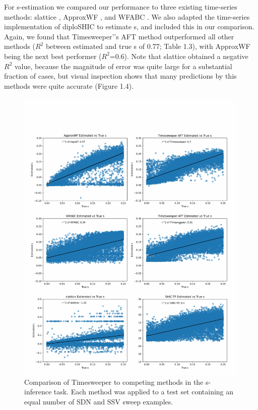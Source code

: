 

For s-estimation we compared our performance to three existing time-series methods: slattice \cite{mathiesonEstimatingSelectionCoefficients2013}, ApproxWF \cite{ferrer-admetllaApproximateMarkovModel2016}, and WFABC \cite{follWFABCWrightFisher2015}. We also adapted the time-series implementation of diploSHIC to estimate s, and included this in our comparison. Again, we found that Timesweeper’'s AFT method outperformed all other methods ($R^2$ between estimated and true s of 0.77; Table 1.3), with ApproxWF being the next best performer ($R^2$=0.6). Note that slattice obtained a negative $R^2$ value, because the magnitude of error was quite large for a substantial fraction of cases, but visual inspection shows that many predictions by this methods were quite accurate (Figure 1.4). 

\begin{figure}
    \centering
    \includegraphics[width=\textwidth]{figures/ch1/Figure_4.pdf}
    \caption[Comparison of Timesweeper to competing methods in the s-inference task]{Comparison of Timesweeper to competing methods in the s-inference task. Each method was applied to a test set containing an equal number of SDN and SSV sweep examples.}
    \label{fig:enter-label}
\end{figure}

